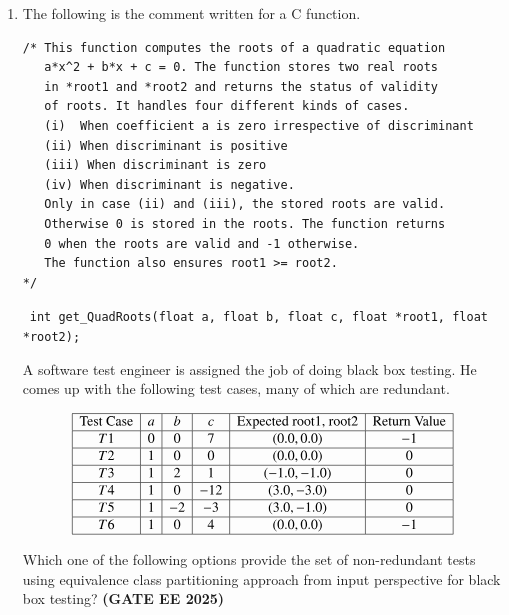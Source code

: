 \documentclass[journal,12pt,onecolumn]{IEEEtran}
\theoremstyle{remark}
\begin{document}
\begin{enumerate}
\begin{enumerate}
\end{enumerate}
\item  The following is the comment written for a C function. 

\begin{verbatim}
/* This function computes the roots of a quadratic equation 
   a*x^2 + b*x + c = 0. The function stores two real roots 
   in *root1 and *root2 and returns the status of validity 
   of roots. It handles four different kinds of cases.
   (i)  When coefficient a is zero irrespective of discriminant
   (ii) When discriminant is positive
   (iii) When discriminant is zero
   (iv) When discriminant is negative.
   Only in case (ii) and (iii), the stored roots are valid. 
   Otherwise 0 is stored in the roots. The function returns 
   0 when the roots are valid and -1 otherwise.
   The function also ensures root1 >= root2.
*/
\end{verbatim}

\
\texttt{int get\_QuadRoots(float a, float b, float c, float *root1, float *root2);}


A software test engineer is assigned the job of doing black box testing. 
He comes up with the following test cases, many of which are redundant.

\[
\begin{array}{|c|c|c|c|c|c|}
\hline
\text{Test Case} & a & b & c & \text{Expected root1, root2} & \text{Return Value} \\
\hline
T1 & 0 & 0 & 7 & (0.0, 0.0) & -1 \\ \hline
T2 & 1 & 0 & 0 & (0.0, 0.0) & 0 \\ \hline
T3 & 1 & 2 & 1 & (-1.0, -1.0) & 0 \\ \hline
T4 & 1 & 0 & -12 & (3.0, -3.0) & 0 \\ \hline
T5 & 1 & -2 & -3 & (3.0, -1.0) & 0 \\ \hline
T6 & 1 & 0 & 4 & (0.0, 0.0) & -1 \\
\hline
\end{array}
\]

Which one of the following options provide the set of non-redundant tests 
using equivalence class partitioning approach from input perspective 
for black box testing? \hfill \textbf{(GATE EE 2025)}



\end{enumerate}
\end{document}
